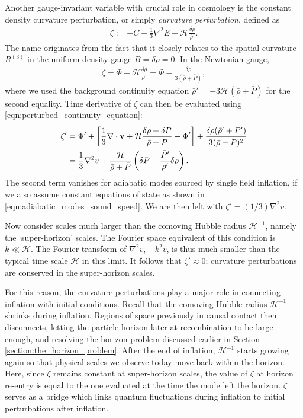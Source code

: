 Another gauge-invariant variable with crucial role in cosmology is the constant density curvature perturbation, or simply \textit{curvature perturbation}, defined as
\begin{align}
	\zeta := - C + \frac{1}{3} \nabla^2 E + \mathcal{H} \frac{\delta\rho}{\bar{\rho}'}.
\end{align}
The name originates from the fact that it closely relates to the spatial curvature $R^{(3)}$ in the uniform density gauge $B=\delta\rho=0$. In the Newtonian gauge,
\begin{align}
	\zeta = \Phi + \mathcal{H}\frac{\delta\rho}{\bar{\rho}'} = \Phi - \frac{\delta\rho}{3(\bar{\rho}+\bar{P})},
\end{align}
where we used the background continuity equation $\bar{\rho}'=-3\mathcal{H}(\bar{\rho}+\bar{P})$ for the second equality. Time derivative of $\zeta$ can then be evaluated using \eqref{eqn:perturbed_continuity_equation}:
\begin{align}
	\zeta' &= \Phi' + \left[ \frac{1}{3}\nabla\cdot\mathbf{v} + \mathcal{H}\frac{\delta\rho + \delta P}{\bar{\rho} + \bar{P}} - \Phi' \right] + \frac{\delta\rho (\bar{\rho}' + \bar{P}')}{3(\bar{\rho}+\bar{P})^2} \\
	&= \frac{1}{3}\nabla^2 v + \frac{\mathcal{H}}{\bar{\rho} + \bar{P}} \left( \delta P - \frac{\bar{P}'}{\bar{\rho}'} \delta\rho \right).
\end{align}
The second term vanishes for adiabatic modes sourced by single field inflation, if we also assume constant equations of state as shown in \eqref{eqn:adiabatic_modes_sound_speed}. We are then left with $\zeta' = (1/3) \nabla^2 v$.

Now consider scales much larger than the comoving Hubble radius $\mathcal{H}^{-1}$, namely the `super-horizon' scales. The Fourier space equivalent of this condition is $k \ll \mathcal{H}$. The Fourier transform of $\nabla^2 v$, $-k^2 \tilde{v}$, is thus much smaller than the typical time scale $\mathcal{H}$ in this limit. It follows that $\zeta'\approx 0$; curvature perturbations are conserved in the super-horizon scales.

For this reason, the curvature perturbations play a major role in connecting inflation with initial conditions. Recall that the comoving Hubble radius $\mathcal{H}^{-1}$ shrinks during inflation. Regions of space previously in causal contact then disconnects, letting the particle horizon later at recombination to be large enough, and resolving the horizon problem discussed earlier in Section \ref{section:the_horizon_problem}. After the end of inflation, $\mathcal{H}^{-1}$ starts growing again so that physical scales we observe today move back within the horizon. Here, since $\zeta$ remains constant at super-horizon scales, the value of $\zeta$ at horizon re-entry is equal to the one evaluated at the time the mode left the horizon. $\zeta$ serves as a bridge which links quantum fluctuations during inflation to initial perturbations after inflation.



